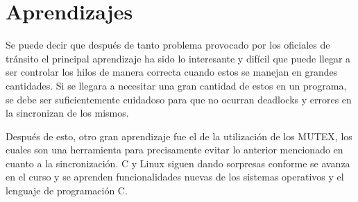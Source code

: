 \documentclass[16pt,a4papper]{article}
\begin{document}
	
	\newpage
	\section{Aprendizajes}
	
	Se puede decir que después de tanto problema provocado por los oficiales de tránsito el principal aprendizaje ha sido lo interesante y difícil que puede llegar a ser controlar los hilos de manera correcta cuando estos se manejan en grandes cantidades. Si se llegara a necesitar una gran cantidad de estos en un programa, se debe ser suficientemente cuidadoso para que no ocurran deadlocks y errores en la sincronizan de los mismos.\par 
	
	Después de esto, otro gran aprendizaje fue el de la utilización de los MUTEX, los cuales son una herramienta para precisamente evitar lo anterior mencionado en cuanto a la sincronización. C y Linux siguen dando sorpresas conforme se avanza en el curso y se aprenden funcionalidades nuevas de los sistemas operativos y el lenguaje de programación C.

	\newpage
	\printbibliography
	
	
\end{document}
